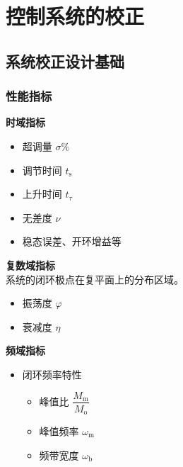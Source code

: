 \chapter{控制系统的校正}
\thispagestyle{empty}

\section{系统校正设计基础}
\subsection{性能指标}
\begin{enumerate}[1. ]
	\begin{minipage}{0.5\linewidth}
		\item \textbf{时域指标}\vspace*{-0.5em}
		\begin{itemize}
			\item 超调量 \quad $\sigma \%$\vspace*{-0.5em}
			\item 调节时间 \quad $t_{\text{s}}$\vspace*{-0.5em}
			\item 上升时间 \quad $t_{\tau}$\vspace*{-0.5em}
			\item 无差度 \quad $\nu$\vspace*{-0.5em}
			\item 稳态误差、开环增益等
		\end{itemize}
	\item \textbf{复数域指标}\\
	系统的闭环极点在复平面上的分布区域。\vspace*{-0.5em}
	\begin{itemize}
		\item 振荡度 \quad $\varphi$\vspace*{-0.5em}
		\item 衰减度 \quad $\eta$
	\end{itemize}
	\end{minipage}
	\begin{minipage}{0.7\linewidth}
	\item \textbf{频域指标}\vspace*{-0.5em}
	\begin{itemize}
		\item 闭环频率特性
		\begin{itemize}
			\item 峰值比 \quad $\dfrac{M_{\text{m}}}{M_{\text{o}}}$
			\item 峰值频率 \quad $\omega_{\text{m}}$
			\item 频带宽度 \quad $\omega_{\text{b}}$
		\end{itemize}
		

\end{itemize}
\end{minipage}
\end{enumerate}
